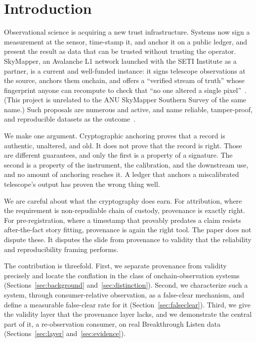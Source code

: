 \documentclass[conference]{IEEEtran}
\begin{document}
\section{Introduction}\label{sec:intro}
Observational science is acquiring a new trust infrastructure. Systems now sign a
measurement at the sensor, time-stamp it, and anchor it on a public ledger, and
present the result as data that can be trusted without trusting the operator.
SkyMapper, an Avalanche L1 network launched with the SETI Institute as a partner,
is a current and well-funded instance: it signs telescope observations at the
source, anchors them onchain, and offers a ``verified stream of truth'' whose
fingerprint anyone can recompute to check that ``no one altered a single
pixel''~\cite{skymapper,skymapper-seti}. (This project is unrelated to the ANU
SkyMapper Southern Survey of the same name.) Such proposals are numerous and
active, and name reliable, tamper-proof, and reproducible datasets as the
outcome~\cite{blockchain-science}.

We make one argument. Cryptographic anchoring proves that a record is authentic,
unaltered, and old. It does not prove that the record is right. Those are
different guarantees, and only the first is a property of a signature. The second
is a property of the instrument, the calibration, and the downstream use, and no
amount of anchoring reaches it. A ledger that anchors a miscalibrated telescope's
output has proven the wrong thing well.

We are careful about what the cryptography does earn. For attribution, where the
requirement is non-repudiable chain of custody, provenance is exactly right. For
pre-registration, where a timestamp that provably predates a claim resists
after-the-fact story fitting, provenance is again the right tool. The paper does
not dispute these. It disputes the slide from provenance to validity that the
reliability and reproducibility framing performs.

The contribution is threefold. First, we separate provenance from validity
precisely and locate the conflation in the class of onchain-observation systems
(Sections~\ref{sec:background} and~\ref{sec:distinction}). Second, we characterize such a system, through
consumer-relative observation, as a false-clear mechanism, and define a
measurable false-clear rate for it (Section~\ref{sec:falseclear}). Third, we give
the validity layer that the provenance layer lacks, and we demonstrate the
central part of it, a re-observation consumer, on real Breakthrough Listen
data (Sections~\ref{sec:layer} and~\ref{sec:evidence}).
\end{document}
